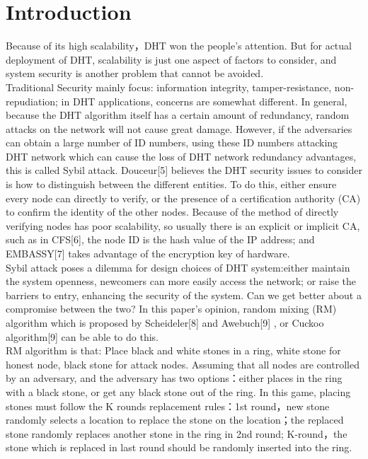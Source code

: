 \documentclass[10pt]{article}
\begin{document}
\section{Introduction}
Because of its high scalability，DHT\cite{ref1,ref2,ref3,ref4} won the people’s attention. But for actual deployment of DHT, scalability is just one aspect of factors to consider, and system security is another problem that cannot be avoided. \\
  Traditional Security mainly focus: information integrity, tamper-resistance, non-repudiation; in DHT applications, concerns are somewhat different. In general, because the DHT algorithm itself has a certain amount of redundancy, random attacks on the network will not cause great damage. However, if the adversaries can obtain a large number of ID numbers, using these ID numbers attacking DHT network which can cause the loss of DHT network redundancy advantages, this is called Sybil attack. Douceur[5] believes the DHT security issues to consider is how to distinguish between the different entities. To do this, either ensure every node can directly to verify, or the presence of a certification authority (CA) to confirm the identity of the other nodes. Because of the method of directly verifying nodes has poor scalability, so usually there is an explicit or implicit CA, such as in CFS[6], the node ID is the hash value of the IP address; and EMBASSY[7] takes advantage of the encryption key of hardware.\\
    Sybil attack poses a dilemma for design choices of DHT system:either maintain the system openness, newcomers can more easily access the network; or raise the barriers to entry, enhancing the security of the system. Can we get better about a compromise between the two? In this paper’s opinion, random mixing (RM) algorithm which is proposed by Scheideler[8] and Awebuch[9] , or Cuckoo algorithm[9] can be able to do this.\\
    RM algorithm is that: Place black and white stones in a ring, white stone for honest node, black stone for attack nodes. Assuming that all nodes are controlled by an adversary, and the adversary has two options：either places in the ring with a black stone, or get any black stone out of the ring. In this game, placing stones must follow the K rounds replacement rules：1st round，new stone randomly selects a location to replace the stone on the location；the replaced stone randomly replaces another stone in the ring in 2nd round; K-round，the stone which is replaced in last round should be randomly inserted into the ring.\\
\end{document}
